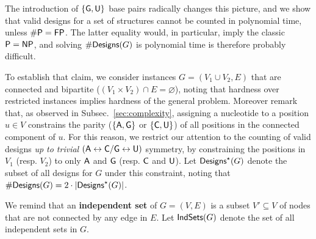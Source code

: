 \documentclass{bioinfo}
\newcommand{\Def}[1]{{\bfseries #1}}
\newcommand{\Design}[1]{{\sf Designs}^{\star}(#1)}
\newcommand{\NumDesign}{\ensuremath{\#}{\sf Designs}\xspace}
\newcommand{\IS}[1]{{\sf IndSets}(#1)}
\newcommand{\Nuc}[1]{{\sf #1}}
\newcommand{\Ab}{\Nuc{A}}
\newcommand{\Cb}{\Nuc{C}}
\newcommand{\Gb}{\Nuc{G}}
\newcommand{\Ub}{\Nuc{U}}
\begin{document}
The introduction of $\{\Gb, \Ub\}$ base pairs radically changes this picture, and we show that valid designs for a set of structures cannot be counted in polynomial time, unless ${\sf\# P}={\sf FP}$. The latter equality would, in particular, imply the classic ${\sf P}={\sf NP}$, and solving $\NumDesign(G)$ is polynomial time is therefore probably difficult. 

To establish that claim, we consider instances $G=(V_1\cup V_2, E)$ that are connected and bipartite ($(V_1\times V_2) \cap E = \varnothing$), noting that hardness over restricted instances implies hardness of the general problem. Moreover remark that, as observed in Subsec.~\ref{sec:complexity}, assigning a nucleotide to a position $u\in V$ constrains the parity ($\{\Ab,\Gb\}$ or $\{\Cb,\Ub\}$) of all positions in the connected component of $u$. For this reason, we restrict our attention to the counting of valid designs \emph{up to trivial} $(\Ab\leftrightarrow \Cb/\Gb\leftrightarrow \Ub)$ symmetry, by constraining the positions in $V_{1}$ (resp. $V_2$) to only $\Ab$ and $\Gb$ (resp. $\Cb$ and $\Ub$). Let $\Design{G}$ denote the subset of all designs for $G$ under this constraint, noting that $\NumDesign(G) = 2\cdot|\Design{G}|$. 


We remind that an \Def{independent set} of $G=(V,E)$ is a subset $V'\subseteq V$ of nodes that are not connected by any edge in $E$. Let $\IS{G}$ denote the set of all independent sets in $G$. 
\end{document}
